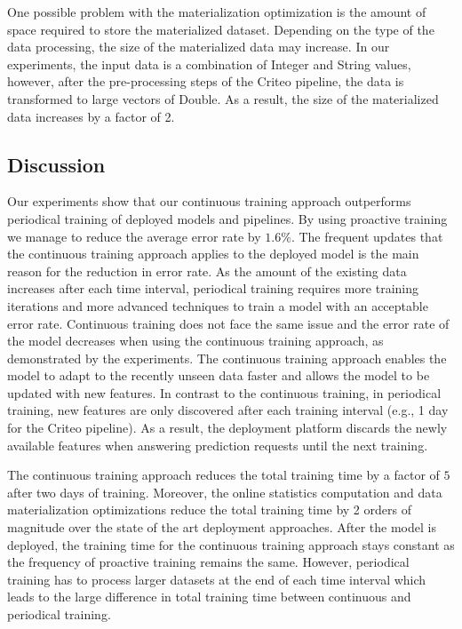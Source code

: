 One possible problem with the materialization optimization is the amount of space required to store the materialized dataset.
Depending on the type of the data processing, the size of the materialized data may increase.
In our experiments, the input data is a combination of Integer and String values, however, after the pre-processing steps of the Criteo pipeline, the data is transformed to large vectors of Double.
As a result, the size of the materialized data increases by a factor of 2.

\subsection{Discussion} \label{subsec:discussion}
Our experiments show that our continuous training approach outperforms periodical training of deployed models and pipelines.
By using proactive training we manage to reduce the average error rate by $1.6\%$.
The frequent updates that the continuous training approach applies to the deployed model is the main reason for the reduction in error rate.
As the amount of the existing data increases after each time interval, periodical training requires more training iterations and more advanced techniques to train a model with an acceptable error rate.
Continuous training does not face the same issue and the error rate of the model decreases when using the continuous training approach, as demonstrated by the experiments.
The continuous training approach enables the model to adapt to the recently unseen data faster and allows the model to be updated with new features.
In contrast to the continuous training, in periodical training, new features are only discovered after each training interval (e.g., 1 day for the Criteo pipeline).
As a result, the deployment platform discards the newly available features when answering prediction requests until the next training.

The continuous training approach reduces the total training time by a factor of $5$ after two days of training.
Moreover, the online statistics computation and data materialization optimizations reduce the total training time by 2 orders of magnitude over the state of the art deployment approaches.
After the model is deployed, the training time for the continuous training approach stays constant as the frequency of proactive training remains the same.
However, periodical training has to process larger datasets at the end of each time interval which leads to the large difference in total training time between continuous and periodical training.

